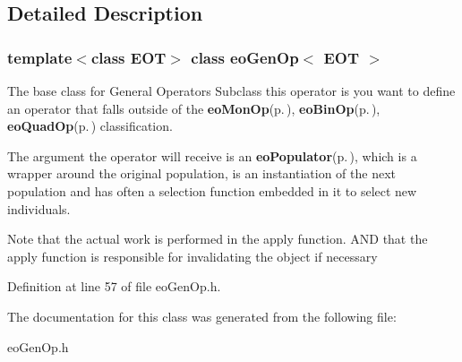 \subsection{Detailed Description}
\subsubsection*{template$<$class EOT$>$ class eo\-Gen\-Op$<$ EOT $>$}

The base class for General Operators Subclass this operator is you want to define an operator that falls outside of the {\bf eo\-Mon\-Op}{\rm (p.\,\pageref{classeo_mon_op})}, {\bf eo\-Bin\-Op}{\rm (p.\,\pageref{classeo_bin_op})}, {\bf eo\-Quad\-Op}{\rm (p.\,\pageref{classeo_quad_op})} classification. 

The argument the operator will receive is an {\bf eo\-Populator}{\rm (p.\,\pageref{classeo_populator})}, which is a wrapper around the original population, is an instantiation of the next population and has often a selection function embedded in it to select new individuals.

Note that the actual work is performed in the apply function. AND that the apply function is responsible for invalidating the object if necessary 



Definition at line 57 of file eo\-Gen\-Op.h.

The documentation for this class was generated from the following file:\begin{CompactItemize}
\item 
eo\-Gen\-Op.h\end{CompactItemize}
